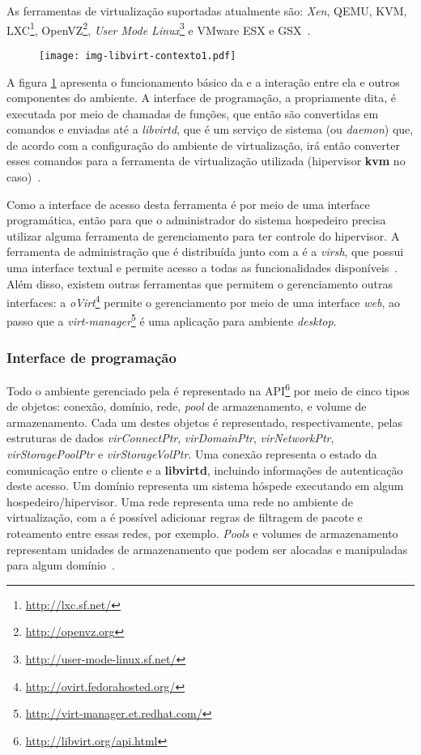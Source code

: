 As ferramentas de virtualização suportadas atualmente são: \emph{Xen}, QEMU,
KVM, LXC\footnote{\url{http://lxc.sf.net/}},
OpenVZ\footnote{\url{http://openvz.org}}, \emph{User Mode
Linux}\footnote{\url{http://user-mode-linux.sf.net/}} e VMware ESX e GSX~\cite{libvirtindex}.

\begin{figure}[htp]
\centering
\texttt{[image: img-libvirt-contexto1.pdf]}
\label{fig:libvirtcontexto1}
\end{figure}

A figura \ref{fig:libvirtcontexto1} apresenta o funcionamento básico da
\libvirt{} e a interação entre ela e outros componentes do ambiente. A
interface de programação, a \libvirt{} propriamente dita, é executada por meio
de chamadas de funções, que então são convertidas em comandos e enviadas até a
\emph{libvirtd}, que é um serviço de sistema (ou \emph{daemon}) que, de acordo
com a configuração do ambiente de virtualização, irá então converter esses
comandos para a ferramenta de virtualização utilizada (hipervisor \textbf{kvm}
no caso)~\cite{bolte2010non}.

Como a interface de acesso desta ferramenta é por meio de uma interface
programática, então para que o administrador do sistema hospedeiro precisa
utilizar alguma ferramenta de gerenciamento para ter controle do hipervisor. A
ferramenta de administração que é distribuída junto com a \libvirt{} é a
\emph{virsh}, que possui uma interface textual e permite acesso a todas as
funcionalidades disponíveis~\cite{virsh2008asilva}. Além disso, existem outras
ferramentas que permitem o gerenciamento outras interfaces: a
\emph{oVirt}\footnote{\url{http://ovirt.fedorahosted.org/}} permite o
gerenciamento por meio de uma interface \emph{web}, ao passo que a
\emph{virt-manager}\footnote{\url{http://virt-manager.et.redhat.com/}} é uma
aplicação para ambiente \emph{desktop}.

\subsubsection{Interface de programação}\label{sec:libvirtapi}

Todo o ambiente gerenciado pela \libvirt{} é representado na
API\footnote{\url{http://libvirt.org/api.html}} por meio de cinco tipos de
objetos: conexão, domínio, rede, \emph{pool} de armazenamento, e volume de
armazenamento. Cada um destes objetos é representado, respectivamente, pelas
estruturas de dados \emph{virConnectPtr}, \emph{virDomainPtr},
\emph{virNetworkPtr}, \emph{virStoragePoolPtr} e \emph{virStorageVolPtr}. Uma
conexão representa o estado da comunicação entre o cliente e a
\textbf{libvirtd}, incluindo informações de autenticação deste acesso. Um
domínio representa um sistema hóspede executando em algum
hospedeiro/hipervisor. Uma rede representa uma rede no ambiente de
virtualização, com a \libvirt{} é possível adicionar regras de filtragem de
pacote e roteamento entre essas redes, por exemplo. \emph{Pools} e volumes de
armazenamento representam unidades de armazenamento que podem ser alocadas e
manipuladas para algum domínio~\cite{libvirtapi}.

